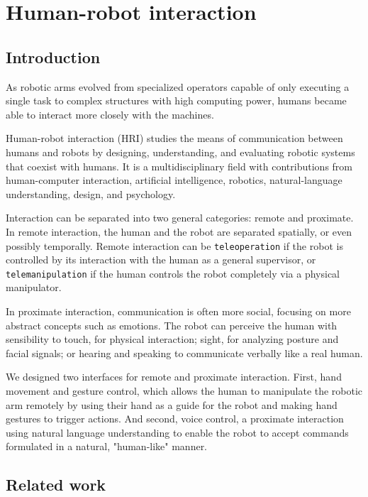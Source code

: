 \chapter{Human-robot interaction}



\section{Introduction}

As robotic arms evolved from specialized operators capable of only executing a single task to complex structures with high computing power, humans became able to interact more closely with the machines.

Human-robot interaction (HRI) studies the means of communication between humans and robots by designing, understanding, and evaluating robotic systems that coexist with humans. It is a multidisciplinary field with contributions from human-computer interaction, artificial intelligence, robotics, natural-language understanding, design, and psychology.

Interaction can be separated into two general categories: remote and proximate. In remote interaction, the human and the robot are separated spatially, or even possibly temporally. Remote interaction can be \lstinline{teleoperation} if the robot is controlled by its interaction with the human as a general supervisor, or \lstinline{telemanipulation} if the human controls the robot completely via a physical manipulator.

In proximate interaction, communication is often more social, focusing on more abstract concepts such as emotions. The robot can perceive the human with sensibility to touch, for physical interaction; sight, for analyzing posture and facial signals; or hearing and speaking to communicate verbally like a real human.

We designed two interfaces for remote and proximate interaction. First, hand movement and gesture control, which allows the human to manipulate the robotic arm remotely by using their hand as a guide for the robot and making hand gestures to trigger actions. And second, voice control, a proximate interaction using natural language understanding to enable the robot to accept commands formulated in a natural, "human-like" manner.



\section{Related work}


